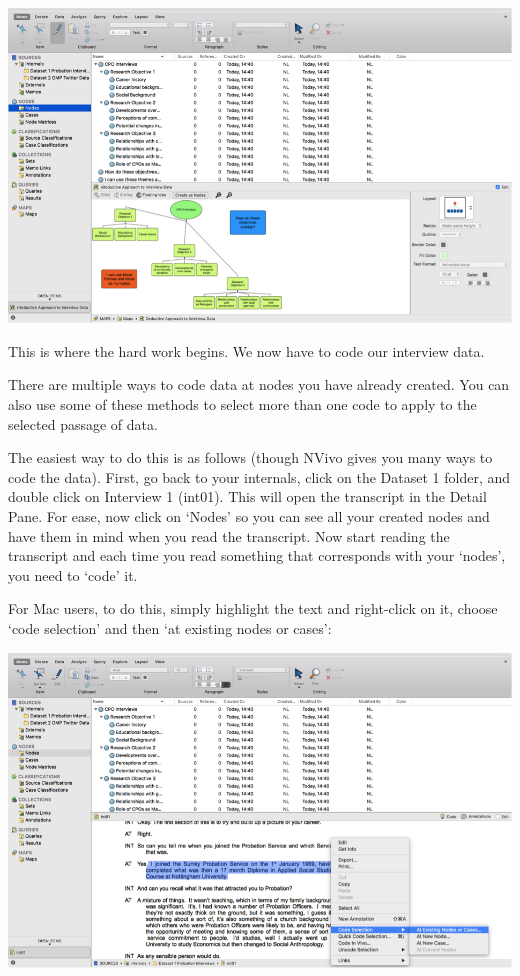 \documentclass[]{book}
\theoremstyle{definition}
\theoremstyle{definition}
\theoremstyle{definition}
\theoremstyle{remark}
\begin{document}
\includegraphics{imgs/qual_41.png}

This is where the hard work begins. We now have to code our interview
data.

There are multiple ways to code data at nodes you have already created.
You can also use some of these methods to select more than one code to
apply to the selected passage of data.

The easiest way to do this is as follows (though NVivo gives you many
ways to code the data). First, go back to your internals, click on the
Dataset 1 folder, and double click on Interview 1 (int01). This will
open the transcript in the Detail Pane. For ease, now click on `Nodes'
so you can see all your created nodes and have them in mind when you
read the transcript. Now start reading the transcript and each time you
read something that corresponds with your `nodes', you need to `code'
it.

For Mac users, to do this, simply highlight the text and right-click on
it, choose `code selection' and then `at existing nodes or cases':

\includegraphics{imgs/qual_42.png}
\end{document}
